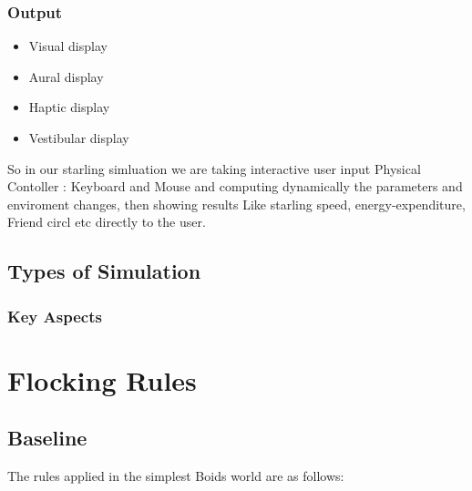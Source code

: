 \documentclass[12pt]{report}
\begin{document}
\subsection{Output}
\begin{itemize}
  \item Visual display
  \item Aural display
  \item Haptic display
  \item Vestibular display
\end{itemize}

So in our starling simluation we are taking interactive user input {Physical Contoller : Keyboard and Mouse} and computing dynamically the parameters and enviroment changes, then showing results {Like starling speed, energy-expenditure, Friend circl etc} directly to the user.  

\section{Types of Simulation}
\subsection{Key Aspects}

\chapter{Flocking Rules}
\section{Baseline}
\label{sec:baseline}

The rules applied in the simplest Boids world are as follows:
\end{document}

